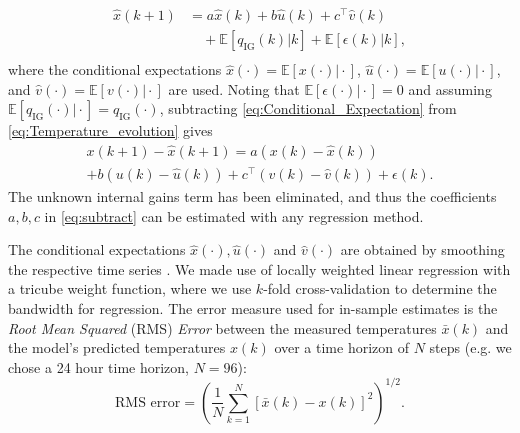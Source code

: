 \begin{equation}\label{eq:Conditional_Expectation}
\begin{aligned}
\hat{x}(k+1) &= a\hat{x}(k) + b\hat{u}(k) + c^\top\hat{v}(k) \\
& \quad + \mathbb{E}\left[ q_{\text{IG}}(k) \vert k \right] + \mathbb{E}\left[ \epsilon(k) \vert k \right],\\
\end{aligned}
\end{equation}
\noindent
where the conditional expectations $\hat{x}(\cdot) = \mathbb{E}\left[ x(\cdot) \vert \cdot \right]$, $\hat{u}(\cdot) = \mathbb{E}\left[ u(\cdot) \vert \cdot \right]$, and $\hat{v}(\cdot) = \mathbb{E}\left[ v(\cdot) \vert \cdot \right]$ are used.
Noting that $\mathbb{E}\left[ \epsilon(\cdot) \vert \cdot \right] = 0$ and assuming $\mathbb{E}\left[ q_{\text{IG}}(\cdot) \vert \cdot \right] = q_{\text{IG}}(\cdot)$, subtracting \eqref{eq:Conditional_Expectation} from \eqref{eq:Temperature_evolution} gives
\begin{equation}\label{eq:subtract}
\begin{split}
x(k+1) - \hat{x}(k+1) = a\left( x(k) - \hat{x}(k) \right) \\ + b\left( u(k) - \hat{u}(k) \right)
+ c^\top \left( v(k) - \hat{v}(k) \right) + \epsilon(k).
\end{split}
\end{equation}
The unknown internal gains term has been eliminated, and thus the coefficients $a, b, c$ in \eqref{eq:subtract} can be estimated with any regression method.

The conditional expectations $\hat{x}(\cdot), \hat{u}(\cdot)$ and $\hat{v}(\cdot)$ are obtained by smoothing the respective time series \cite{Aswani:2012aa}. We made use of locally weighted linear regression with a tricube weight function, where we use $k$-fold cross-validation to determine the bandwidth for regression.
The error measure used for in-sample estimates is the \textit{Root Mean Squared} (RMS) \textit{Error} between the measured temperatures $\bar{x}(k)$ and the model's predicted temperatures $x(k)$ over a time horizon of $N$ steps (e.g. we chose a 24 hour time horizon, $N = 96$):
\begin{equation}\label{eq:RMS}
\text{RMS error} = \left(\frac{1}{N}\textstyle\sum_{k=1}^N \left[\bar{x}(k) - x(k)\right]^2 \right)^{1/2}.
\end{equation}
